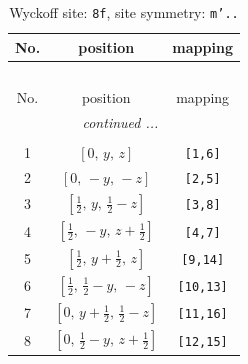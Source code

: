 \documentclass[fleqn,8pt]{jsarticle}
\begin{document}
\begin{longtable}{ccc}
\caption{Wyckoff site: {\tt 8f}, site symmetry: {\tt m'..}}
 \\
 \hline \hline
No. & position & mapping \\ \hline \endfirsthead

\multicolumn{2}{l}{\tablename\ \thetable{}} \\
 \hline \hline
No. & position & mapping \\ \hline \endhead

 \hline \hline
\multicolumn{2}{r}{\footnotesize\it continued ...} \\ \endfoot

 \hline \hline
\multicolumn{2}{r}{} \\ \endlastfoot

1 & $\left[ 0,\, y,\, z \right]$ & {\tt [1,6]} \\ \hline
2 & $\left[ 0,\, - y,\, - z \right]$ & {\tt [2,5]} \\ \hline
3 & $\left[ \frac{1}{2},\, y,\, \frac{1}{2} - z \right]$ & {\tt [3,8]} \\ \hline
4 & $\left[ \frac{1}{2},\, - y,\, z + \frac{1}{2} \right]$ & {\tt [4,7]} \\ \hline
5 & $\left[ \frac{1}{2},\, y + \frac{1}{2},\, z \right]$ & {\tt [9,14]} \\ \hline
6 & $\left[ \frac{1}{2},\, \frac{1}{2} - y,\, - z \right]$ & {\tt [10,13]} \\ \hline
7 & $\left[ 0,\, y + \frac{1}{2},\, \frac{1}{2} - z \right]$ & {\tt [11,16]} \\ \hline
8 & $\left[ 0,\, \frac{1}{2} - y,\, z + \frac{1}{2} \right]$ & {\tt [12,15]} \\
\end{longtable}
\renewcommand{\arraystretch}{1.2}
\end{document}
